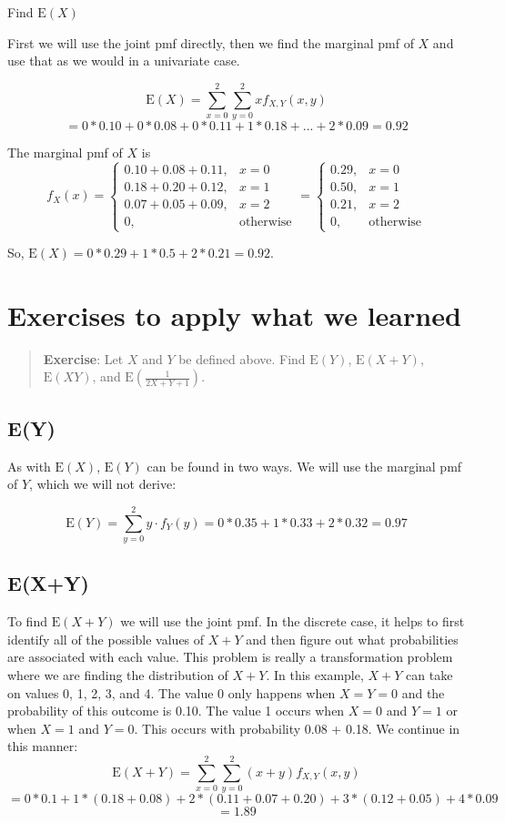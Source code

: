 \documentclass[
  letterpaper,
  DIV=11,
  numbers=noendperiod]{scrreprt}
\begin{document}
Find \(\mbox{E}(X)\)

First we will use the joint pmf directly, then we find the marginal pmf
of \(X\) and use that as we would in a univariate case.

\[
\mbox{E}(X)=\sum_{x=0}^2 \sum_{y=0}^2 x f_{X,Y}(x,y)
\] \[
=0*0.10+0*0.08+0*0.11+1*0.18+...+2*0.09 = 0.92
\]

The marginal pmf of \(X\) is \[
f_X(x)=\left\{\begin{array}{ll} 0.10+0.08+0.11, & x=0 \\
0.18+0.20+0.12, & x=1 \\
0.07+0.05+0.09, & x=2 \\
0, & \mbox{otherwise} 
\end{array}\right. = \left\{\begin{array}{ll} 0.29, & x=0 \\
0.50, & x=1 \\
0.21, & x=2 \\
0, & \mbox{otherwise} 
\end{array}\right.
\]

So, \(\mbox{E}(X)=0*0.29+1*0.5+2*0.21=0.92\).

\section{Exercises to apply what we
learned}\label{exercises-to-apply-what-we-learned}

\begin{quote}
\textbf{Exercise}: Let \(X\) and \(Y\) be defined above. Find
\(\mbox{E}(Y)\), \(\mbox{E}(X+Y)\), \(\mbox{E}(XY)\), and
\(\mbox{E}\left(\frac{1}{2X+Y+1}\right)\).
\end{quote}

\subsection{E(Y)}\label{ey}

As with \(\mbox{E}(X)\), \(\mbox{E}(Y)\) can be found in two ways. We
will use the marginal pmf of \(Y\), which we will not derive:

\[
\mbox{E}(Y)=\sum_{y=0}^2 y \cdot f_Y(y)=0*0.35+1*0.33+2*0.32 = 0.97
\]

\subsection{E(X+Y)}\label{exy}

To find \(\mbox{E}(X+Y)\) we will use the joint pmf. In the discrete
case, it helps to first identify all of the possible values of \(X+Y\)
and then figure out what probabilities are associated with each value.
This problem is really a transformation problem where we are finding the
distribution of \(X+Y\). In this example, \(X+Y\) can take on values 0,
1, 2, 3, and 4. The value 0 only happens when \(X=Y=0\) and the
probability of this outcome is 0.10. The value 1 occurs when \(X=0\) and
\(Y=1\) or when \(X=1\) and \(Y=0\). This occurs with probability 0.08 +
0.18. We continue in this manner: \[
\mbox{E}(X+Y)=\sum_{x=0}^2\sum_{y=0}^2 (x+y)f_{X,Y}(x,y) 
\] \[
= 0*0.1+1*(0.18+0.08)+2*(0.11+0.07+0.20)+3*(0.12+0.05)+4*0.09 
\] \[
= 1.89
\]
\end{document}
